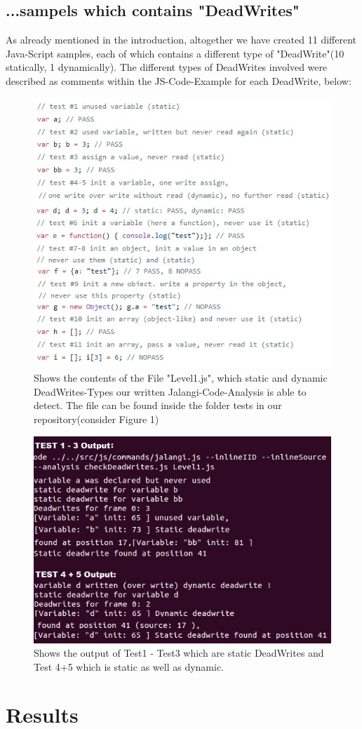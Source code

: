 \documentclass[a4paper]{scrartcl}
\begin{document}
\subsection{...sampels which contains "DeadWrites"}
As already mentioned in the introduction, altogether we have created 11 different Java-Script samples, each of which contains a different type of "DeadWrite"(10 statically, 1 dynamically). The different types of DeadWrites involved were described as comments within the JS-Code-Example for each DeadWrite, below:
\begin{figure}[!htb]
	\centering
	\includegraphics[width=0.5\linewidth]{Sample1.jpg}
	\caption{Shows the contents of the File "Level1.js", which  static and dynamic DeadWrites-Types our written Jalangi-Code-Analysis is able to detect. The file can be found inside the folder tests in our repository(consider Figure 1)}
	\label{img:grafik-dummy}
\end{figure}
\begin{figure}[!htb]
	\centering
	\includegraphics[width=0.5\linewidth]{OUStaticDeadWrite.jpg}
	\caption{Shows the output of Test1 - Test3 which are static DeadWrites and Test 4+5 which is static as well as dynamic.}
	\label{img:grafik-dummy}
\end{figure}
\newpage
\section{Results}
\end{document}

